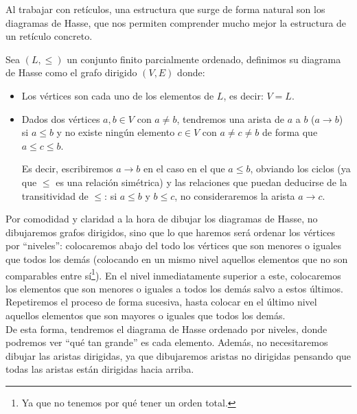 Al trabajar con retículos, una estructura que surge de forma natural son los diagramas de Hasse, que nos permiten comprender mucho mejor la estructura de un retículo concreto.

\begin{definicion}
    Sea $(L,\leq)$ un conjunto finito parcialmente ordenado, definimos su diagrama de Hasse como el grafo dirigido $(V, E)$ donde:
    \begin{itemize}
        \item Los vértices son cada uno de los elementos de $L$, es decir: $V = L$.
        \item Dados dos vértices $a,b\in V$ con $a\neq b$, tendremos una arista de $a$ a $b$ ($a\to b$) si $a\leq b$ y no existe ningún elemento $c\in V$ con $a\neq c\neq b$ de forma que $a\leq c\leq b$.

            Es decir, escribiremos $a\to b$ en el caso en el que $a\leq b$, obviando los ciclos (ya que $\leq$ es una relación simétrica) y las relaciones que puedan deducirse de la transitividad de $\leq$: si $a\leq b$ y $b\leq c$, no consideraremos la arista $a\to c$.
    \end{itemize}
\end{definicion}

\begin{notacion}
    Por comodidad y claridad a la hora de dibujar los diagramas de Hasse, no dibujaremos grafos dirigidos, sino que lo que haremos será ordenar los vértices por ``niveles'': colocaremos abajo del todo los vértices que son menores o iguales que todos los demás (colocando en un mismo nivel aquellos elementos que no son comparables entre sí\footnote{Ya que no tenemos por qué tener un orden total.}). En el nivel inmediatamente superior a este, colocaremos los elementos que son menores o iguales a todos los demás salvo a estos últimos. Repetiremos el proceso de forma sucesiva, hasta colocar en el último nivel aquellos elementos que son mayores o iguales que todos los demás.\\

    De esta forma, tendremos el diagrama de Hasse ordenado por niveles, donde podremos ver ``qué tan grande'' es cada elemento. Además, no necesitaremos dibujar las aristas dirigidas, ya que dibujaremos aristas no dirigidas pensando que todas las aristas están dirigidas hacia arriba.
\end{notacion}


